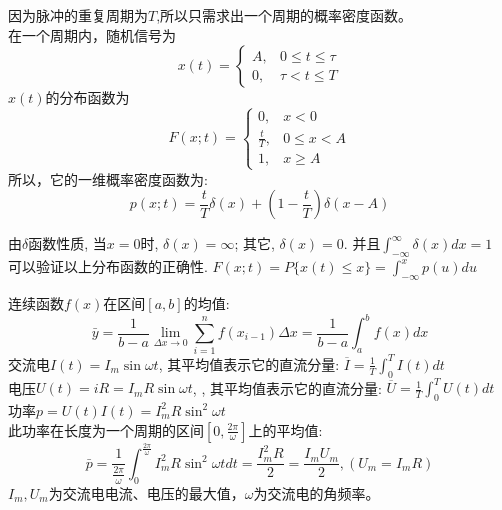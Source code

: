\begin{frame}[shrink]
\begin{example}[解]
	因为脉冲的重复周期为$T$,所以只需求出一个周期的概率密度函数。\\
	在一个周期内，随机信号为
	\[
	x(t)=\begin{cases}
	A,&0\le t\le\tau\\
	0,&\tau<t\le T
	\end{cases} 
	\]
	$x(t)$的分布函数为
	\[
	F(x;t)=\begin{cases}
	0,&x<0\\
	\frac{t}{T},&0\le x<A\\
	1,&x\ge A
	\end{cases} 
	\]
	所以，它的一维概率密度函数为:
	\[p(x;t)=\frac{t}{T}\delta(x)+(1-\frac{t}{T})\delta(x-A) \]
\end{example}
\small
由$\delta$函数性质, 当$x=0$时, $\delta(x)=\infty$; 其它, $\delta(x)=0$. 并且$\int_{-\infty}^{\infty}\delta(x)dx=1$\\
可以验证以上分布函数的正确性.  $F(x; t)=P\{x(t)\le x\}=\int_{-\infty}^{x}p(u)du$
\end{frame}


\begin{frame}
连续函数$f(x)$在区间$[a,b]$的均值:
\[\bar{y}=\frac{1}{b-a}\lim\limits_{\Delta x\to 0}\sum\limits_{i=1}^{n}f(x_{i-1})\Delta x=\frac{1}{b-a}\int_{a}^{b}f(x)dx \]
交流电$I(t)=I_m\sin\omega t$, 其平均值表示它的直流分量: $\overline{I}=\frac{1}{T}\int_{0}^{T}I(t)dt$\\
电压$U(t)=iR=I_mR\sin\omega t$, , 其平均值表示它的直流分量: $\overline{U}=\frac{1}{T}\int_{0}^{T}U(t)dt$\\
功率$p=U(t)I(t)=I_m^2R\sin^2\omega t$\\
此功率在长度为一个周期的区间$[0,\frac{2\pi}{\omega}]$上的平均值:
\[\bar{p}=\frac{1}{\frac{2\pi}{\omega}}\int_{0}^{\frac{2\pi}{\omega}}I_m^2R\sin^2\omega tdt=\frac{I_m^2R}{2}=\frac{I_mU_m}{2},(U_m=I_mR) \]
$I_m,U_m$为交流电电流、电压的最大值，$\omega$为交流电的角频率。
\end{frame}


